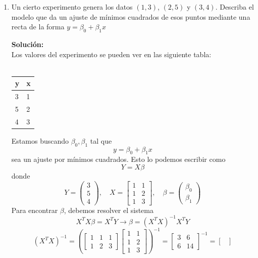 \documentclass[12pt]{article}
\newenvironment{solucion}
{\begin{mdframed}[backgroundcolor=black!10]
		{\bf Solución:}\\
	}
	{
	\end{mdframed}
}
\newenvironment{preguntas}
{\begin{enumerate}\itemsep12pt
	}
	{
	\end{enumerate}
}
\newcommand{\ra}{\rightarrow}
\begin{document}
\begin{preguntas}
\begin{solucion}
\begin{enumerate}[a)]
\end{enumerate}
\end{solucion}
\item Un cierto experimento genera los datos $(1,3)$, $(2,5)$ y $(3,4)$. Describa el modelo que da un ajuste de mínimos cuadrados de esos puntos mediante una recta de la forma $y = \beta_0 +  \beta_1x$
\begin{solucion}
Los valores del experimento se pueden ver en las siguiente tabla:\\
		\\
		\begin{center}
		\begin{tabular}{|l|l|}
			\hline
			\textbf{y} & \textbf{x} \\ \hline
			3          & 1          \\ \hline
			5          & 2          \\ \hline
			4          & 3          \\ \hline
		\end{tabular}
		\end{center}
		Estamos buscando $\beta_0, \beta_1$ tal que
		$$y = \beta_0 +  \beta_1x$$
		sea un ajuste por mínimos cuadrados. Esto lo podemos escribir como
		$$Y = X\beta$$
		donde
		$$Y = \begin{pmatrix}
		3 \\ 5 \\ 4
		\end{pmatrix}, \quad 
		X = \begin{bmatrix}
		1 & 1 \\
		1 & 2 \\
		1 & 3
		\end{bmatrix}, \quad
		\beta = \begin{pmatrix}
		\beta_0 \\ \beta_1
		\end{pmatrix}$$
		Para encontrar $\beta$, debemos resolver el sistema
		$$X^TX\beta = X^TY \ra \beta = (X^TX)^{-1}X^TY$$
		$$(X^TX)^{-1} = \left(\begin{bmatrix}
		1 & 1 & 1\\
		1 & 2 & 3
		\end{bmatrix}
		\begin{bmatrix}
		1 & 1 \\
		1 & 2 \\
		1 & 3
		\end{bmatrix}\right)^{-1}
		 = 
		 \begin{bmatrix}
		 3 & 6 \\
		 6 & 14
		 \end{bmatrix}^{-1} = \begin{bmatrix}

\end{bmatrix}$$
\end{solucion}
\end{preguntas}
\end{document}
